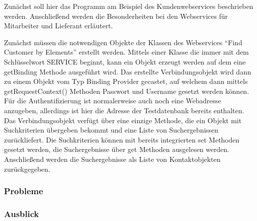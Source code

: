 Zunächst soll hier das Programm am Beispiel des Kundenwebservices beschrieben werden. Anschließend werden die Besonderheiten
bei den Webservices für Mitarbeiter und Lieferant erläutert.

Zunächst müssen die notwendigen Objekte der Klassen des Webservices ``Find Customer by Elements'' erstellt werden. Mittels
einer Klasse die immer mit dem Schlüsselwort SERVICE beginnt, kann ein Objekt erzeugt werden auf dem eine getBinding Methode
ausgeführt wird. Das erstellte Verbindungsobjekt wird dann zu einem Objekt vom Typ Binding Provider gecastet, auf welchem dann
mittels getRequestContext() Methoden Passwort und Username gesetzt werden können. Für die Authentifizierung ist normalerweise
auch noch eine Webadresse anzugeben, allerdings ist hier die Adresse der Testdatenbank bereits enthalten. Das 
Verbindungsobjekt verfügt über eine einzige Methode, die ein Objekt mit Suchkriterien übergeben bekommt und eine Liste 
von Suchergebnissen zurückliefert. Die Suchkriterien können mit bereits integrierten set Methoden gesetzt werden,
die Suchergebnisse über get Methoden ausgelesen werden. Anschließend werden die Suchergebnisse als Liste von Kontaktobjekten
zurückgegeben.







\subsubsection{Probleme}

\subsubsection{Ausblick}